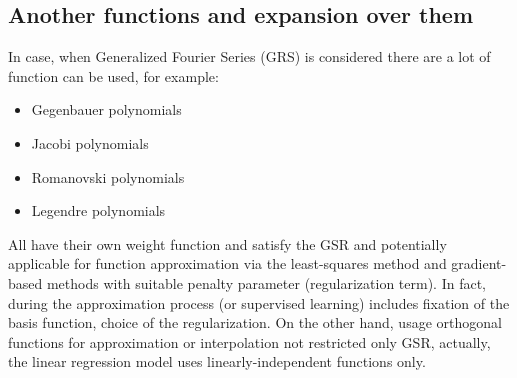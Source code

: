 \subsection{Another functions and expansion over them}
In case, when Generalized Fourier Series (GRS) is considered there are a lot of function can be used, for example\cite{abramowitz1965handbook}:
\begin{itemize}
	\item Gegenbauer polynomials
	\item Jacobi polynomials
	\item Romanovski polynomials
	\item Legendre polynomials
\end{itemize}

All have their own weight function and satisfy the GSR and potentially applicable for function approximation via the least-squares method and gradient-based methods with suitable penalty parameter (regularization term). In fact, during the approximation process (or supervised learning) includes fixation of the basis function, choice of the regularization. On the other hand, usage orthogonal functions for approximation or interpolation not restricted only GSR, actually, the linear regression model uses linearly-independent functions only.


